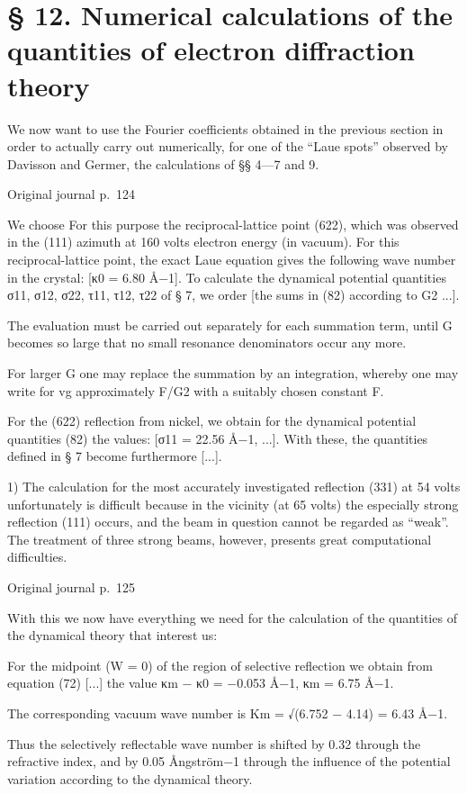 \documentclass[10pt]{article}
\newcommand{\origpage}[1]{\par\medskip\noindent\hfill{\small\color{notegray}Original journal p.~#1}\hfill\mbox{}\par\smallskip}
\begin{document}
\section*{§ 12. Numerical calculations of the quantities of electron diffraction theory}
We now want to use the Fourier coefficients obtained in the previous section in order to actually carry out numerically, for one of the “Laue spots” observed by Davisson and Germer, the calculations of §§ 4—7 and 9.\par
\origpage{124}
We choose For this purpose the reciprocal-lattice point (622), which was observed in the (111) azimuth at 160 volts electron energy (in vacuum). For this reciprocal-lattice point, the exact Laue equation gives the following wave number in the crystal: [κ0 = 6.80 Å−1]. To calculate the dynamical potential quantities σ11, σ12, σ22, τ11, τ12, τ22 of § 7, we order [the sums in (82) according to G2 ...].\par
The evaluation must be carried out separately for each summation term, until G becomes so large that no small resonance denominators occur any more.\par
For larger G one may replace the summation by an integration, whereby one may write for vg approximately F/G2 with a suitably chosen constant F.\par
For the (622) reflection from nickel, we obtain for the dynamical potential quantities (82) the values: [σ11 = 22.56 Å−1, ...]. With these, the quantities defined in § 7 become furthermore [...].\par
\noindent\footnotesize 1) The calculation for the most accurately investigated reflection (331) at 54 volts unfortunately is difficult because in the vicinity (at 65 volts) the especially strong reflection (111) occurs, and the beam in question cannot be regarded as “weak”. The treatment of three strong beams, however, presents great computational difficulties.\par\normalsize
\origpage{125}
With this we now have everything we need for the calculation of the quantities of the dynamical theory that interest us:\par
For the midpoint (W = 0) of the region of selective reflection we obtain from equation (72) [...] the value κm − κ0 = −0.053 Å−1, κm = 6.75 Å−1.\par
The corresponding vacuum wave number is Km = √(6.752 − 4.14) = 6.43 Å−1.\par
Thus the selectively reflectable wave number is shifted by 0.32 through the refractive index, and by 0.05 Ångström−1 through the influence of the potential variation according to the dynamical theory.\par
\end{document}
